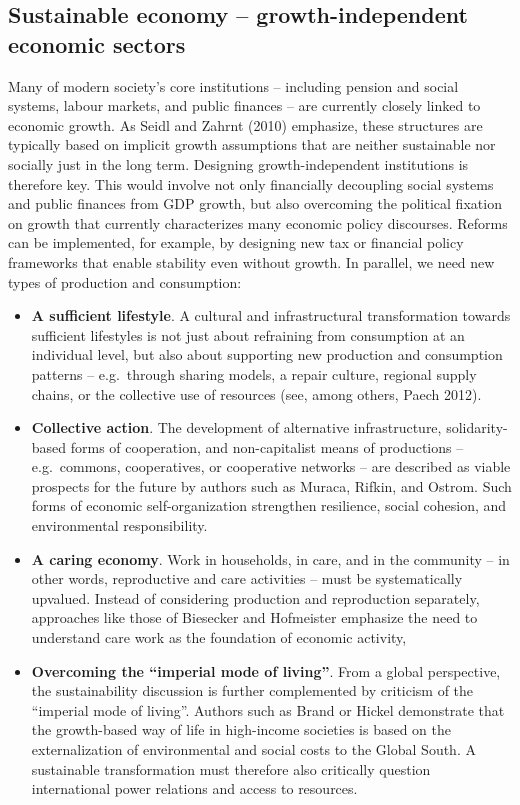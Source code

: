 \documentclass[
  a4paper,
  DIV=11,
  numbers=noendperiod,
  oneside,
  openany]{scrreprt}
\begin{document}
\subsection{Sustainable economy -- growth-independent economic
sectors}\label{sustainable-economy-growth-independent-economic-sectors}

Many of modern society's core institutions -- including pension and
social systems, labour markets, and public finances -- are currently
closely linked to economic growth. As Seidl and Zahrnt (2010) emphasize,
these structures are typically based on implicit growth assumptions that
are neither sustainable nor socially just in the long term. Designing
growth-independent institutions is therefore key. This would involve not
only financially decoupling social systems and public finances from GDP
growth, but also overcoming the political fixation on growth that
currently characterizes many economic policy discourses. Reforms can be
implemented, for example, by designing new tax or financial policy
frameworks that enable stability even without growth. In parallel, we
need new types of production and consumption:

\begin{itemize}
\item
  \textbf{A sufficient lifestyle}. A cultural and infrastructural
  transformation towards sufficient lifestyles is not just about
  refraining from consumption at an individual level, but also about
  supporting new production and consumption patterns -- e.g.~through
  sharing models, a repair culture, regional supply chains, or the
  collective use of resources (see, among others, Paech 2012).
\item
  \textbf{Collective action}. The development of alternative
  infrastructure, solidarity-based forms of cooperation, and
  non-capitalist means of productions -- e.g.~commons, cooperatives, or
  cooperative networks -- are described as viable prospects for the
  future by authors such as Muraca, Rifkin, and Ostrom. Such forms of
  economic self-organization strengthen resilience, social cohesion, and
  environmental responsibility.
\item
  \textbf{A caring economy}. Work in households, in care, and in the
  community -- in other words, reproductive and care activities -- must
  be systematically upvalued. Instead of considering production and
  reproduction separately, approaches like those of Biesecker and
  Hofmeister emphasize the need to understand care work as the
  foundation of economic activity,
\item
  \textbf{Overcoming the ``imperial mode of living''}. From a global
  perspective, the sustainability discussion is further complemented by
  criticism of the ``imperial mode of living''. Authors such as Brand or
  Hickel demonstrate that the growth-based way of life in high-income
  societies is based on the externalization of environmental and social
  costs to the Global South. A sustainable transformation must therefore
  also critically question international power relations and access to
  resources.
\end{itemize}
\end{document}
